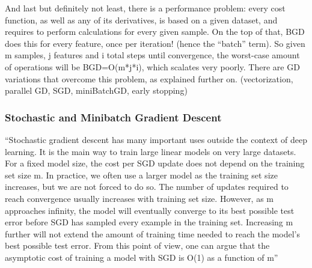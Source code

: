 
And last but definitely not least, there is a performance problem: every cost function, as well as any of its derivatives, is based on a given dataset, and requires to perform calculations for every given sample. On the top of that, BGD does this for every feature, once per iteration! (hence the ``batch'' term). So given m samples, j features and i total steps until convergence, the worst-case amount of operations will be BGD=O(m*j*i), which scalates very poorly. There are GD variations that overcome this problem, as explained further on. (vectorization, parallel GD, SGD, miniBatchGD, early stopping)\\



\subsubsection{Stochastic and Minibatch Gradient Descent}

``Stochastic gradient descent has many important uses outside the context of deep learning. It is the main way to train large linear models on very large datasets. For a fixed model size, the cost per SGD update does not depend on the training set size m. In practice, we often use a larger model as the training set size increases, but we are not forced to do so. The number of updates required to reach convergence usually increases with training set size. However, as m approaches infinity, the model will eventually converge to its best possible test error before SGD has sampled every example in the training set. Increasing m further will not extend the amount of training time needed to reach the model’s best possible test error. From this point of view, one can argue that the asymptotic cost of training a model with SGD is O(1) as a function of m''\cite[p.152]{goodfellow}


